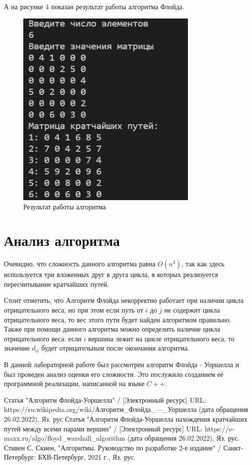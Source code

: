 \documentclass[bachelor, och, labwork]{shiza}
\begin{document}
  А на рисунке 4 показан результат работы алгоритма Флойда.
  \begin{figure}[H]
    \centering
    \includegraphics[width=0.8\textwidth]{img/2_4}
    \caption{Результат работы алгоритма}
  \end{figure}

  \section{Анализ алгоритма}

  Очевидно, что сложность данного алгоритма равна $O(n^3)$, так как здесь используется три вложенных друг в друга цикла,
  в которых реализуется пересчитывание кратчайших путей.

  Стоит отметить, что Алгоритм Флойда некорректно работает при наличии цикла отрицательного веса, но при этом если путь 
  от $i$ до $j$ не содержит цикла отрицательного веса, то вес этого пути будет найден алгоритмом правильно. Также при помощи
  данного алгоритма можно определить наличие цикла отрицательного веса: если $i$ вершина лежит на цикле отрицательного 
  веса, то значение $d_{ii}$ будет отрицательным после окончания алгоритма.

\conclusion

В данной лабораторной работе был рассмотрен алгоритм Флойда - Уоршелла и был проведен анализ оценки его сложности.
Это послужило созданием её программной реализации, написанной на языке $C++$. 

\begin{thebibliography}{3}
  Статья "Алгоритм Флойда-Уоршелла"  / [Электронный ресурс] URL: https://ru.wikipedia.org/wiki/Алгоритм_Флойда_—_Уоршелла (дата обращения 26.02.2022), Яз. рус
  Статья "Алгоритм Флойда-Уоршелла нахождения кратчайших путей между всеми парами вершин" / [Электронный ресурс] URL: https://e-maxx.ru/algo/floyd_warshall_algorithm (дата обращения 26.02.2022), Яз. рус.
  Стивен С. Скиен, "Алгоритмы. Руководство по разработке 2-е издание" / Санкт-Петербург: БХВ-Петербург, 2021 г., Яз. рус.   
\end{thebibliography}
\end{document}
